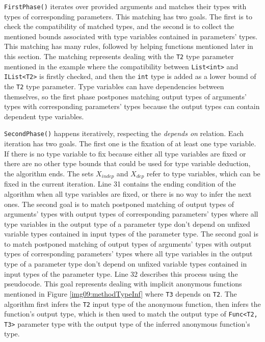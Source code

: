 \par
\texttt{FirstPhase()} iterates over provided arguments and matches their types with types of corresponding parameters. 
This matching has two goals. 
The first is to check the compatibility of matched types, and the second is to collect the mentioned bounds associated with type variables contained in parameters’ types. 
This matching has many rules, followed by helping functions mentioned later in this section.
The matching represents dealing with the \texttt{T2} type parameter mentioned in the example where the compatibility between \texttt{List<int>} and \texttt{IList<T2>} is firstly checked, and then the \texttt{int} type is added as a lower bound of the \texttt{T2} type parameter. 
Type variables can have dependencies between themselves, so the first phase postpones matching output types of arguments’ types with corresponding parameters’ types because the output types can contain dependent type variables.
\par
\texttt{SecondPhase()} happens iteratively, respecting the \textit{depends on} relation.
Each iteration has two goals.
The first one is the fixation of at least one type variable.
If there is no type variable to fix because either all type variables are fixed or there are no other type bounds that could be used for type variable deduction, the algorithm ends.
The sets \texttt{$X_{indep}$} and \texttt{$X_{dep}$} refer to type variables, which can be fixed in the current iteration.
Line 31 contains the ending condition of the algorithm when all type variables are fixed, or there is no way to infer the next ones.
The second goal is to match postponed matching of output types of arguments' types with output types of corresponding parameters' types where all type variables in the output type of a parameter type don't depend on unfixed variable types contained in input types of the parameter type.
The second goal is to match postponed matching of output types of arguments' types with output types of corresponding parameters' types where all type variables in the output type of a parameter type don't depend on unfixed variable types contained in input types of the parameter type.
Line 32 describes this process using the pseudocode.
This goal represents dealing with implicit anonymous functions mentioned in Figure \ref{img09:methodTypeInf} where \texttt{T3} depends on \texttt{T2}.
The algorithm first infers the \texttt{T2} input type of the anonymous function, then infers the function's output type, which is then used to match the output type of \texttt{Func<T2, T3>} parameter type with the output type of the inferred anonymous function's type.
